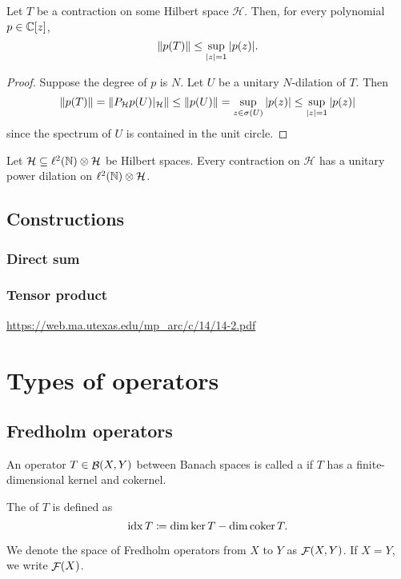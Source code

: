 \begin{proposition}
Let $T$ be a contraction on some Hilbert space $\mathcal{H}$. Then, for every polynomial $p\in\mathbb{C}[z]$,
\[ \lVert p(T)\rVert\leq \sup_{|z|=1}|p(z)|. \]
\end{proposition}
\begin{proof}
Suppose the degree of $p$ is $N$. Let $U$ be a unitary $N$-dilation of $T$. Then
\[ \lVert p(T)\rVert = \lVert P_\mathcal{H}p(U)|_\mathcal{H}\rVert\leq \lVert p(U)\rVert = \sup_{z\in\sigma(U)}|p(z)| \leq \sup_{|z|=1}|p(z)| \]
since the spectrum of $U$ is contained in the unit circle.
\end{proof}

\begin{theorem}
Let $\mathcal{H} \subseteq \ell^2(\mathbb{N})\otimes\mathcal{H}$ be Hilbert spaces. Every contraction on $\mathcal{H}$ has a unitary power dilation on $\ell^2(\mathbb{N})\otimes\mathcal{H}$.
\end{theorem}




\section{Constructions}
\subsection{Direct sum}
\subsection{Tensor product}
\url{https://web.ma.utexas.edu/mp_arc/c/14/14-2.pdf}



\chapter{Types of operators}
\section{Fredholm operators}
\begin{definition}
An operator $T\in\mathop{\mathcal{B}}(X,Y)$ between Banach spaces is called a  if $T$ has a finite-dimensional kernel and cokernel.

The  of $T$ is defined as
\[ \operatorname{idx} T \coloneqq \dim\ker T - \dim\operatorname{coker} T.  \]

We denote the space of Fredholm operators from $X$ to $Y$ as $\mathop{\mathcal{F}}(X,Y)$. If $X=Y$, we write $\mathop{\mathcal{F}}(X)$.
\end{definition}

